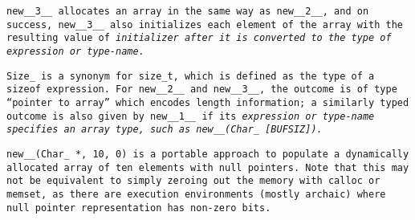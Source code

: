 \tt{new__3__} allocates an array in the same way as \tt{new__2__},
and on success, \tt{new__3__} also initializes each element of
the array with the resulting value of \it{initializer} after it
is converted to the type of \it{expression} or \it{type-name}.

\note \tt{Size_} is a synonym for \tt{size_t},
which is defined as the type of a \tt{sizeof} expression.
For \tt{new__2__} and \tt{new__3__},
the outcome is of type ``pointer to array'' which encodes length information;
a similarly typed outcome is also given by \tt{new__1__} if its \it{expression}
or \it{type-name} specifies an array type, such as \tt{new__(Char_ [BUFSIZ])}.

\example \tt{new__(Char_ *, 10, 0)} is a portable approach to populate
a dynamically allocated array of ten elements with null pointers.
Note that this may not be equivalent to simply zeroing out the memory
with \tt{calloc} or \tt{memset}, as there are execution environments
(mostly archaic) where null pointer representation has non-zero bits.
